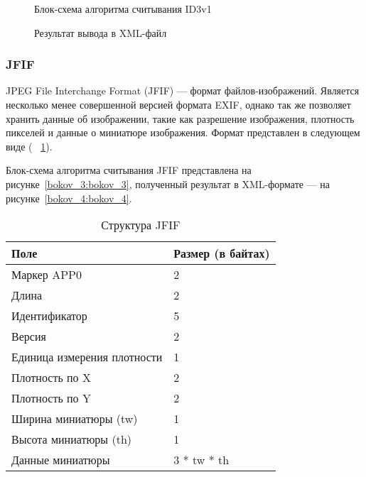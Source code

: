 \begin{figure}[h!]
\caption{Блок-схема алгоритма считывания ID3v1}
\label{bokov_1:bokov_1}
\end{figure} 

\begin{figure}[h!]
\caption{Результат вывода в XML-файл}
\label{bokov_2:bokov_2}
\end{figure}

\clearpage

\subsubsection{JFIF}

JPEG File Interchange Format (JFIF) --- формат файлов-изображений. Является несколько менее совершенной версией формата EXIF, однако так же позволяет хранить данные об изображении, такие как разрешение изображения, плотность пикселей и данные о миниатюре изображения. Формат представлен в следующем виде ( ~\ref{tab:jfif}).


Блок-схема алгоритма считывания JFIF представлена на рисунке~\ref{bokov_3:bokov_3}, полученный результат в XML-формате --- на рисунке~\ref{bokov_4:bokov_4}.

\begin{table}[ht]
\caption{Структура JFIF}
\label{tab:jfif}
\begin{center}
\begin{tabularx}{\linewidth}{|l|X|}
\hline
Поле & Размер (в байтах) \\
\hline
Маркер APP0 & 2 \\
\hline
Длина & 2 \\
\hline
Идентификатор & 5 \\
\hline
Версия & 2 \\
\hline
Единица измерения плотности & 1 \\
\hline
Плотность по X & 2 \\
\hline
Плотность по Y & 2 \\
\hline
Ширина миниатюры (tw) & 1 \\
\hline
Высота миниатюры (th) & 1 \\
\hline
Данные миниатюры & 3 * tw * th \\
\hline
\end{tabularx}
\end{center}
\end{table}

